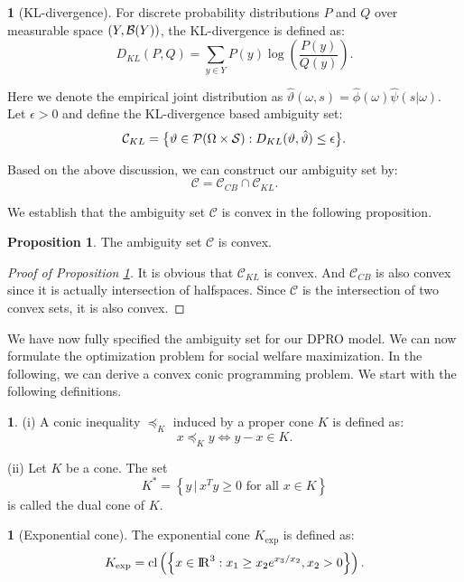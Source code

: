 \documentclass[11pt,oneside]{article}
\theoremstyle{plain}
\theoremstyle{plain}
\theoremstyle{plain}
\theoremstyle{plain}
\theoremstyle{plain}
\theoremstyle{definition}
\newtheorem{defn}[thm]{\protect\definitionname}
\theoremstyle{definition}
\newtheorem{prop}{Proposition}
\theoremstyle{remark}
\theoremstyle{plain}
\providecommand{\definitionname}{Definition}
\newcommand{\R}{{\rm I\!R}}
\renewcommand{\Re}{\R}
\renewcommand{\Re}{\R}
\newcommand{\mcs}{{\cal S}}
\begin{document}
\begin{defn}[KL-divergence]
    For discrete probability distributions $P$ and $Q$ over measurable space $(Y,{\cal B}(Y))$, the KL-divergence is defined as:
    \[
    D_{KL} (P,Q)=  \sum_{y\in Y} P(y) \log \left( \frac{P(y)}{Q(y)} \right).
    \] 
\end{defn}

Here we denote the empirical joint distribution as $\hat{\vartheta}(\omega,s) = \hat{\phi}(\omega) \hat{\psi}(s|\omega).$ Let $\epsilon > 0$ and define the KL-divergence based ambiguity set:
\[
\mathcal{C}_{KL} = \big\{ \vartheta \in {\cal P}(\Omega \times \mcs): D_{KL}(\vartheta, \hat{\vartheta}) \leq \epsilon \big\}.
\]

Based on the above discussion, we can construct our ambiguity set by:
\[
\mathcal{C} = \mathcal{C}_{CB} \cap \mathcal{C}_{KL}.
\]

We establish that the ambiguity set $\mathcal{C}$ is convex in the following proposition.
\begin{prop}
    \label{prop:_ambiguity_convex}
    The ambiguity set $\mathcal{C}$ is convex.
\end{prop}
\begin{proof}[Proof of Proposition \ref{prop:_ambiguity_convex}]
    It is obvious that $\mathcal{C}_{KL}$ is convex. And $\mathcal{C}_{CB}$ is also convex since it is actually intersection of halfspaces. Since $\mathcal{C}$ is 
    the intersection of two convex sets, it is also convex.
\end{proof}

We have now fully specified the ambiguity set for our DPRO model. We can now formulate the optimization problem for social welfare maximization. In the following, we can derive a convex conic programming problem. We start with the following definitions.

\begin{defn}
\label{defn:cone}
(i) A conic inequality $\preceq_K$ induced by a proper cone $K$ is defined as:
$$
x \preceq_K y \Leftrightarrow y - x \in K.
$$

(ii) Let $K$ be a cone. The set 
\[
K^* =\left\{ y\, | \, x^T y\geq 0 \text{ for all } x\in K \right\}
\]
is called the dual cone of $K$.
\end{defn}

\begin{defn}[Exponential cone]
\label{defn:Exponential_cone}
The exponential cone $K_\text{exp}$ is defined as: 
$$K_\text{exp} = \text{cl}\left(\left\{x \in \Re^3:x_1 \geq x_2 e^{x_3/x_2},x_2>0 \right\}\right).$$
\end{defn}
\end{document}
